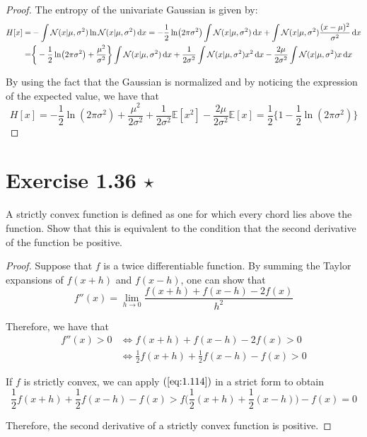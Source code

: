 \begin{proof}
    The entropy of the univariate Gaussian is given by:
    \begin{align*}
        H[x] 
        =& -\int \mathcal{N}(x | \mu, \sigma^2) \ln \mathcal{N}(x | \mu, \sigma^2) \mathop{}\!\mathrm{d} x
        = -\frac{1}{2} \ln (2\pi \sigma^2) \int \mathcal{N}(x | \mu, \sigma^2) \mathop{}\!\mathrm{d} x 
            + \int \mathcal{N}(x | \mu, \sigma^2) \frac{(x - \mu)^2}{\sigma^2} \mathop{}\!\mathrm{d} x \\
        =& \bigg\{-\frac{1}{2} \ln (2\pi \sigma^2) + \frac{\mu^2}{\sigma^2} \bigg\}
            \int \mathcal{N}(x | \mu, \sigma^2) \mathop{}\!\mathrm{d} x 
            + \frac{1}{2\sigma^2} \int \mathcal{N}(x | \mu, \sigma^2) x^2 \mathop{}\!\mathrm{d} x 
            - \frac{2\mu}{2\sigma^2} \int \mathcal{N}(x | \mu, \sigma^2) x\mathop{}\!\mathrm{d} x
    \end{align*}

    By using the fact that the Gaussian is normalized and 
    by noticing the expression of the expected value, we have that
    \[
        H[x] 
        = -\frac{1}{2} \ln(2\pi \sigma^2) 
        + \frac{\mu^2}{2\sigma^2} 
        + \frac{1}{2\sigma^2} \mathbb{E}[x^2]
        - \frac{2\mu}{2\sigma^2} \mathbb{E}[x]
        = \frac{1}{2} \bigg\{1 - \frac{1}{2} \ln(2\pi \sigma^2)\bigg\} \label{eq:1.110}\tag{1.110}
    \]
\end{proof}

\section*{Exercise 1.36 $\star$}
A strictly convex function is defined as one for which every chord lies
above the function. Show that this is equivalent to the condition that
the second derivative of the function be positive.

\vspace{1em}

\begin{proof}
    Suppose that $f$ is a twice differentiable function. By 
    summing the Taylor expansions of $f(x + h)$ and $f(x - h)$, 
    one can show that
    \[
        f''(x) = \lim_{h \to 0} \frac{f(x + h) + f(x - h) - 2f(x)}{h^2}
    \] 

    Therefore, we have that
    \begin{align*}
        f''(x) > 0 
        &\iff f(x + h) + f(x - h) - 2f(x) > 0 \\
        & \iff \frac{1}{2} f(x + h) + \frac{1}{2} f(x - h) - f(x) > 0
    \end{align*}

    If $f$ is strictly convex, we can apply $(\ref{eq:1.114})$ in a strict form to obtain 
    \[
        \frac{1}{2} f(x + h) + \frac{1}{2} f(x - h) - f(x) >
        f\bigg(\frac{1}{2}(x+h) + \frac{1}{2}(x - h)\bigg) - f(x) = 0
    \] 

    Therefore, the second derivative of a strictly convex function is positive.
\end{proof}

